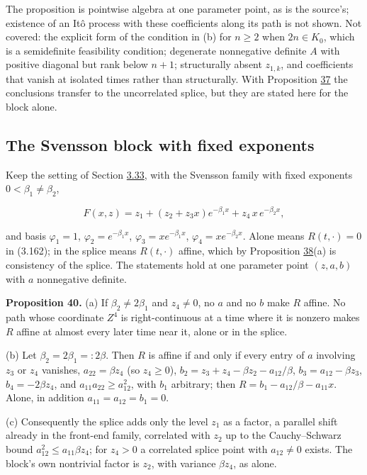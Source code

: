 \documentclass[11pt]{article}
\begin{document}
The proposition is pointwise algebra at one parameter point, as is the source's; existence of an Itô process with these coefficients along its path is not shown. Not covered: the explicit form of the condition in (b) for \(n\ge2\) when \(2n\in K_0\), which is a semidefinite feasibility condition; degenerate nonnegative definite \(A\) with positive diagonal but rank below \(n+1\); structurally absent \(z_{1,k}\), and coefficients that vanish at isolated times rather than structurally. With Proposition \hyperref[res:Proposition-37]{37} the conclusions transfer to the uncorrelated splice, but they are stated here for the block alone.

\subsection{The Svensson block with fixed exponents}\label{sec:3.35}

Keep the setting of Section \hyperref[sec:3.33]{3.33}, with the Svensson family with fixed exponents \(0<\beta_1\neq\beta_2\),

\begin{equation*}
F(x,z)=z_1+(z_2+z_3x)e^{-\beta_1x}+z_4\,x\,e^{-\beta_2x}, \tag{3.166}\label{eq:3.166}
\end{equation*}

and basis \(\varphi_1=1\), \(\varphi_2=e^{-\beta_1x}\), \(\varphi_3=xe^{-\beta_1x}\), \(\varphi_4=xe^{-\beta_2x}\). Alone means \(R(t,\cdot)=0\) in (3.162); in the splice means \(R(t,\cdot)\) affine, which by Proposition \hyperref[res:Proposition-38]{38}(a) is consistency of the splice. The statements hold at one parameter point \((z,a,b)\) with \(a\) nonnegative definite.

\label{res:Proposition-40}
\textbf{Proposition 40.} (a) If \(\beta_2\neq2\beta_1\) and \(z_4\neq0\), no \(a\) and no \(b\) make \(R\) affine. No path whose coordinate \(Z^4\) is right-continuous at a time where it is nonzero makes \(R\) affine at almost every later time near it, alone or in the splice.

(b) Let \(\beta_2=2\beta_1=:2\beta\). Then \(R\) is affine if and only if every entry of \(a\) involving \(z_3\) or \(z_4\) vanishes, \(a_{22}=\beta z_4\) (so \(z_4\ge0\)), \(b_2=z_3+z_4-\beta z_2-a_{12}/\beta\), \(b_3=a_{12}-\beta z_3\), \(b_4=-2\beta z_4\), and \(a_{11}a_{22}\ge a_{12}^2\), with \(b_1\) arbitrary; then \(R=b_1-a_{12}/\beta-a_{11}x\). Alone, in addition \(a_{11}=a_{12}=b_1=0\).

(c) Consequently the splice adds only the level \(z_1\) as a factor, a parallel shift already in the front-end family, correlated with \(z_2\) up to the Cauchy--Schwarz bound \(a_{12}^2\le a_{11}\beta z_4\); for \(z_4>0\) a correlated splice point with \(a_{12}\neq0\) exists. The block's own nontrivial factor is \(z_2\), with variance \(\beta z_4\), as alone.
\end{document}
